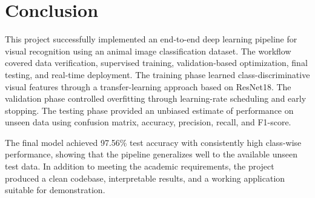 \documentclass[12pt,a4paper]{article}
\begin{document}
\section{Conclusion}
This project successfully implemented an end-to-end deep learning pipeline for visual recognition using an animal image classification dataset. The workflow covered data verification, supervised training, validation-based optimization, final testing, and real-time deployment. The training phase learned class-discriminative visual features through a transfer-learning approach based on ResNet18. The validation phase controlled overfitting through learning-rate scheduling and early stopping. The testing phase provided an unbiased estimate of performance on unseen data using confusion matrix, accuracy, precision, recall, and F1-score.

The final model achieved 97.56\% test accuracy with consistently high class-wise performance, showing that the pipeline generalizes well to the available unseen test data. In addition to meeting the academic requirements, the project produced a clean codebase, interpretable results, and a working application suitable for demonstration.
\end{document}
